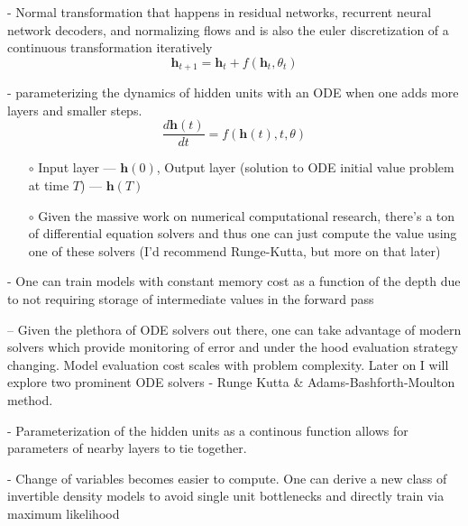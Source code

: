 \documentclass[10pt,a4paper]{article}
\begin{document}
\begin{description}[font=$\bullet$~\normalfont\scshape\color{blue!50!black}]
\item [Hidden State Transformation] - Normal transformation that happens in residual networks, recurrent neural network decoders, and normalizing flows and is also the euler discretization of a continuous transformation iteratively
\begin{equation}
    \textbf{h}_{t+1} = \textbf{h}_{t} + f(\textbf{h}_{t}, \theta_{t})
\end{equation}
\item [Ordinary Differential Equation Neural Network] - parameterizing the dynamics of hidden units with an ODE when one adds more layers and smaller steps.
\begin{equation}
    \frac{d\textbf{h}(t)}{dt} = f(\textbf{h}(t),t, \theta)
\end{equation}
  \begin{itemize}
      \item[$\circ$] Input layer --- $\textbf{h}(0)$, Output layer (solution to ODE initial value problem at time $T$) --- $\textbf{h}(T)$
      \item[$\circ$] Given the massive work on numerical computational research, there's a ton of differential equation solvers and thus one can just compute the value using one of these solvers (I'd recommend Runge-Kutta, but more on that later)
  \end{itemize}
\item [Memory Efficiency] - One can train models with constant memory cost as a function of the depth due to not requiring storage of intermediate values in the forward pass
\item [Adaptive Computation] -- Given the plethora of ODE solvers out there, one can take advantage of modern solvers which provide monitoring of error and under the hood evaluation strategy changing. Model evaluation cost scales with problem complexity. Later on I will explore two prominent ODE solvers - Runge Kutta \& Adams-Bashforth-Moulton method. 
\item [Parameter Efficiency] - Parameterization of the hidden units as a continous function allows for parameters of nearby layers to tie together.
\item [Scalable and invertible normalizing flows] - Change of variables becomes easier to compute. One can derive a new class of invertible density models to avoid single unit bottlenecks and directly train via maximum likelihood
\begin{itemize}

\end{itemize}
\end{description}
\end{document}
